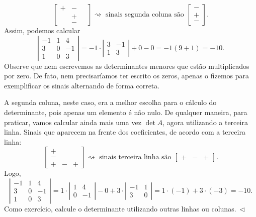 \begin{ex}
\begin{equation}
\begin{bmatrix}
+ & - &  \,\, \\
\,\,& + &  \,\, \\
\,\,& - &  \,\,
\end{bmatrix}\rightsquigarrow \text{ sinais segunda coluna são }
\begin{bmatrix}
- \\ + \\ -
\end{bmatrix}.
\end{equation} Assim, podemos calcular
\begin{equation}
\left|
\begin{matrix}
-1 & 1 & 4 \\
3 & 0 & -1 \\
1 & 0 & 3
\end{matrix}
\right| = -1 \cdot
\left|
\begin{matrix}
3  & -1 \\
1  & 3
\end{matrix}
\right| + 0 - 0 = -1 (9 + 1) = -10.
\end{equation} Observe que nem escrevemos as determinantes menores que estão multiplicados por zero. De fato, nem precisaríamos ter escrito os zeros, apenas o fizemos para exemplificar os sinais alternando de forma correta.

A segunda coluna, neste caso, era a melhor escolha para o cálculo do determinante, pois apenas um elemento é não nulo. De qualquer maneira, para praticar, vamos calcular ainda mais uma vez $\det A$, agora utilizando a terceira linha. Sinais que aparecem na frente dos coeficientes, de acordo com a terceira linha:
\begin{equation}
\begin{bmatrix}
+ & \,\, & \,\, \\
- & \,\, & \,\, \\
+ &  -   &   +
\end{bmatrix}\rightsquigarrow \text{ sinais terceira linha são }
\begin{bmatrix}
+ & - & +
\end{bmatrix}.
\end{equation} Logo,
\begin{equation}
\left|
\begin{matrix}
-1 & 1 & 4 \\
3 & 0 & -1 \\
1 & 0 & 3
\end{matrix}
\right| = 1 \cdot
\left|
\begin{matrix}
 1 & 4 \\
 0 & -1
\end{matrix}
\right| - 0 + 3 \cdot
\left|
\begin{matrix}
-1 & 1 \\
3 & 0
\end{matrix}
\right| = 1 \cdot (-1) + 3 \cdot (-3) = -10.
\end{equation} Como exercício, calcule o determinante utilizando outras linhas ou colunas$. \ \lhd$
\end{ex}

